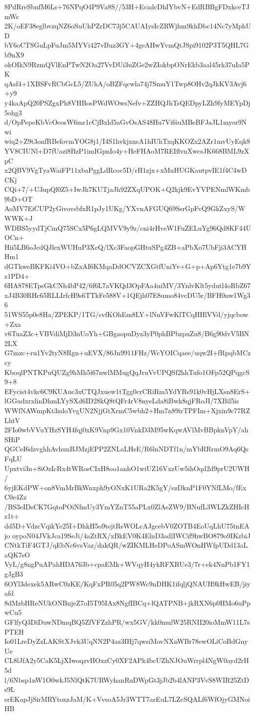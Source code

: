 8PdRreSbnfM6Ls+76NPqO4P9Va8S//53H+EcadcDhIYbvN+EdRBBgFDxkceTJmWc
2K/oEF38eglbvzqNZ6oSuUhPZrDC73j5CAUAIysIcZRWjhm9khDbc14Nc7yMphUD
bY6oCTSGuLpFuJm5MYVi427vBuz3GY+4geAHwYvmQtJSpi9102P3T5QHL7Gb9nX9
okOIkN9RzmQVlEnPTwN2Oa27VvDUi3uZGe2wZIokbpONrEkb3aal45rk37uIa5PK
qAsf4+1XBSFvRCbGcL5/ZUhA/oBZFqcwla74j7SmuY1Twp8OHv2qJkKV3Avj6+y9
y4kaApQ20PSZgxPh8VHBosPWdWOwsNefv+ZZHQJhTsQEDpyLZh9fyMEYpDj5ohg3
d/OpPepeKbVcOeosW6mr1cCjBxld5aGvOsAS48Hu7Vi6iuMBeBFJaJL1myor9Nwi
wiq2+Z9t3onfRBefovmYOG8j1/I4S1hvkjxnsA1hIUhTxqKKOZx2AZr1mvUyEqk8
YV8CIUNl+D7fUazi8BzP1imIGpnIo4y+HeFHAoM7REIflvnXwcsJK668BML9zXpC
x2QBV9VgTyaWaiFP11xbaPggLdRcoc5D/rH1zjx+xMuHUGKautpvIE1f4C4wDCKj
CQi+7/+U3upQl0Z5+IwJh7KUTjaJh92ZXqUPOK+Q2kjk9EvYVPENmlWKmb9bD+OT
AoMV7EiCUP2yGivovsbfxR1pJy1UKg/YXvnAFGUQ69SsrGpFvQ9GkZxyS/WWWK+J
WDBS5yydTjCmQ75SCx5P6gLQMVV9y9z/cni4rHveW1FuZELuYg96Qd8KF44UOCn+
Hii5LB6oJcdQJlexWUHuP3XeQ/lXc3FaopGHtuSPg4ZB+aPbXo7UbFji3ACYHHm1
dGTkweBKFKi4VO+bZxAI6KMqaDdOCVZCXGtfUniYv+G+p+Ap6Ytg1e7b9Yz1PD4+
6HA878ETpsGkCNh4bP42/6f6L7aVKQd3OpFAa4uiMV/3YnlvKlt5ydutl4oRbZ67
xJ4B30RHc65RLLIrfcH9s6TTkFe588V+1QEjh07E8umo84vcDU5r/BFH0nw1Wg36
51WS55p0e8Ha/ZPEKP/1TG/svfKOhEm8LY+lNnVFwKlTCqHHlVVd/yjqcbow+Zxa
v6TuaZ3c+VBVdiMjD3nUoYh+GBgaopuDyz3yP0phBPbzpuZu8/B6g90dvV5BN2LX
G7mzc+ru1Yv2tyN8Rgn+uEVX/86Jn9911FHz/WcYOICqaee/uqw2I+fRpqbMCzcy
KboqlPNTKPuQUZg9hMh5i67nwlMMugQqJruVvUPQSf2hhTufo1OFp52QPqgcS9+8
EFycist4vkc6C9KUAuc3xCTQJxuew1tTgg0crCRiRm5YdYRs91k0vHjLXsn8ErS+
lGGudxrxlinDhmLYySXd6ID28kQ8tQFr4rV8nyeLda8iBwk8qjFRoJI/7XBil5is
WWfNAWmpKt3zdoYvgUN2NjjGtXrmC5wbh2+Hm7n89irTPFIm+Xjxin9c77RZLhtV
2FIo0wbVVuYHzSYH4fqj0xK9Vnp9Gx10VnkD3M95wKqwAVlMvBBpknVpY/ahSHiP
QGCeI6dzvghhAvhunBJMzjEPP2ZNLaLHsE/R6lnNDTf1n/mYbRRrmO9Aq6QsFqLU
Upxtvi3n+8iOzIcRx4tWRosCIxH8oo1anhO1wiUZ16VxzUw5ihOqd2d9prU2UWH/
6yjEKdPW+on8VmMrBkWnxph9yONxK1URa2K5gY/ezDknP1F0YNfLMo/fExC0e4Zz
/BS3eIDsCK7GqtoPOiNfmUy3YmYZnT55aPLx0ZlAeZW9/BNufL3WLZkZHIcHz1t+
dd5D+VdzcVqikYe25I+DhkH5o9tejtRsWOLcAJgcebV0ZOTB4EoUqLhU75tnEAjo
oypoN04JVkJca19SeJi/4aZtRX/xBkEV0K4ElnD3adlIWCif9hwBO879o9IKzbiJ
CNtkTiF4GTJ/qEbNc6vsVaz/dakQR/wZIKMLHeDPoASmWOnHWfpUDd13aLaQK7sO
VyL/g8ngPuAPahHDA763b+cpaEMk+WVqyH4ykRFXRUe3/7r+ek4NnPb1FY1gJgB3
6OYl3dexek5ARwC0zKE/KqFxPR05q2PW8Wc9nDHK1ifqljQNAUH9kHwEB/jiyafd
8dMzbHReNUkONBnjeZ7oI5T95IAx8NgfIBCq+lQATPNB+jkRXN6p0HMo6uPpwCu5
GFlfyQ3DiDuwNDmqBQ5ZfVFZzhPR/wx5GV/kk0mulW25RNII20ioMmW11L7sPTEH
Io01LreDyZzLAKStXJvk3UqNN2P4az3IHj7qwsiMovNXnWBr78ewOLiCoBdGnyUe
CL8lJfA2y5CaK5LjXIwoqzvHOxzCy0XF2APk4bcUZhNJOuWrrpl4NgW0ayd2rH5d
l/6Nbsp1nW1O0wkJ5NlQtK7URWyhanRuDWpGt3jJb2b4lANP3VvS8WIR25ZtDs9L
srEKapJjSirMRYtoxzJaM/K+VvsoA5Jr3WTT7arEuL7LZcSQALf6WfOjyGMNoiHB
